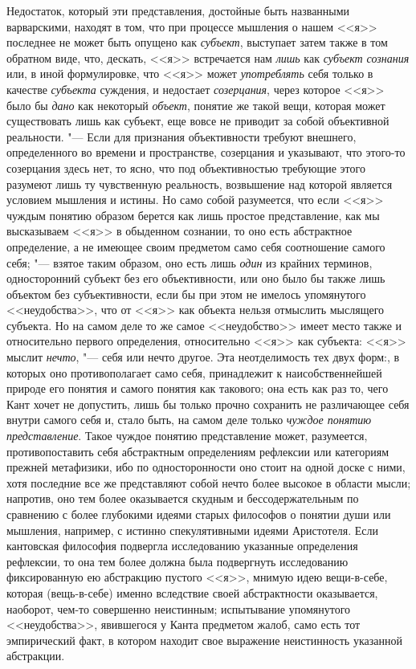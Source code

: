 {{Недостаток, который эти представления, достойные быть
названными варварскими, находят в том, что при процессе мышления о нашем
<<я>> последнее не может быть опущено как
{\em субъект}, выступает
затем также в том обратном виде, что, дескать, <<я>> встречается нам
{\em лишь} как
{\em субъект сознания}
или, в иной формулировке, что <<я>> может
{\em употреблять} себя
только в качестве {\em субъекта}
суждения, и недостает
{\em созерцания}, через
которое <<я>> было бы {\em дано}
как некоторый
{\em объект}, понятие же
такой вещи, которая может существовать лишь как субъект, еще вовсе не
приводит за собой объективной
реальности\label{bkm:bm98}.
"--- Если для признания объективности требуют внешнего,
определенного во времени и пространстве, созерцания и указывают, что
этого-то созерцания здесь нет, то ясно, что под объективностью требующие
этого разумеют лишь ту чувственную реальность, возвышение над которой
является условием мышления и истины. Но само собой разумеется, что если <<я>>
чуждым понятию образом берется как лишь простое представление, как мы
высказываем <<я>> в обыденном сознании, то оно есть абстрактное определение,
а не имеющее своим предметом само себя соотношение самого
себя; "--- взятое таким образом, оно есть лишь
{\em один} из крайних
терминов, односторонний субъект без его объективности, или оно было бы
также лишь объектом без субъективности, если бы при этом не имелось
упомянутого <<неудобства>>, что от <<я>> как объекта нельзя отмыслить мыслящего
субъекта. Но на самом деле то же самое <<неудобство>> имеет место также и
относительно первого определения, относительно <<я>> как субъекта: <<я>> мыслит
{\em нечто}, "--- себя или
нечто другое. Эта неотделимость тех двух форм:, в которых оно
противополагает само себя, принадлежит к наисобственнейшей природе его
понятия и самого понятия как такового; она есть как раз то, чего Кант хочет
не допустить, лишь бы только прочно сохранить не различающее
себя внутри самого себя и, стало быть, на самом деле только
{\em чуждое понятию представление}.
Такое чуждое понятию представление может, разумеется,
противопоставить себя абстрактным определениям рефлексии или категориям
прежней метафизики, ибо по односторонности оно стоит на одной доске с ними,
хотя последние все же представляют собой нечто более высокое в области
мысли; напротив, оно тем более оказывается скудным и бессодержательным по
сравнению с более глубокими идеями старых философов о понятии души или
мышления, например, с истинно спекулятивными идеями Аристотеля. Если
кантовская философия подвергла исследованию указанные определения
рефлексии, то она тем более должна была подвергнуть исследованию
фиксированную ею абстракцию пустого <<я>>, мнимую идею вещи-в-себе, которая
(вещь-в-себе) именно вследствие своей абстрактности оказывается, наоборот,
чем-то совершенно неистинным; испытывание упомянутого <<неудобства>>,
явившегося у Канта предметом жалоб, само есть тот эмпирический факт, в
котором находит свое выражение неистинность указанной абстракции.

}}
